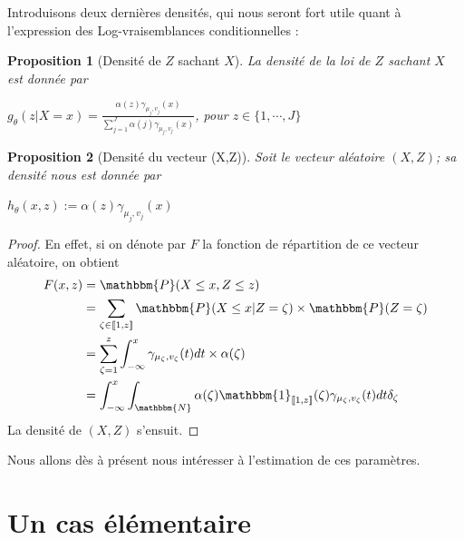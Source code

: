 \documentclass[frenchb]{report}
\newcommand{\N}{\mathbbm{N}}
\newcommand{\1}{\mathbbm{1}}
\newcommand{\prob}{\mathbbm{P}}
\newtheorem{prop}{Proposition}
\theoremstyle{definition}\newtheorem{defn}{Définition}
\theoremstyle{definition}\newtheorem{exm}{Exemple}
\theoremstyle{definition}\newtheorem{nota}{Notation}
\theoremstyle{definition}\newtheorem{rem}{Remarque}
\begin{document}
Introduisons deux dernières densités, qui nous seront fort utile quant à l'expression des Log-vraisemblances conditionnelles :

\begin{prop}[Densité de $Z$ sachant $X$] La densité de la loi de $Z$ sachant $X$ est donnée par
\begin{center}
$g_\theta(z | X=x ) = \frac{\displaystyle\alpha(z)\gamma_{\mu_j, v_j}(x)}{\displaystyle\sum_{j=1}^J\alpha(j)\gamma_{\mu_j, v_j}(x)}$, pour $z\in \{1,\cdots,J\}$
\end{center}
\end{prop}


\begin{prop}[Densité du vecteur (X,Z)]
Soit le vecteur aléatoire $(X, Z)$; sa densité nous est donnée par
\begin{center} $h_\theta(x,z) := \alpha(z)\gamma_{\mu_j, v_j}(x)$ \end{center}
\end{prop}

\begin{proof}
En effet, si on dénote par $F$ la fonction de répartition de ce vecteur aléatoire, on obtient
\begin{align*}
F(x, z) &= \prob(X \leq x, Z \leq z)\\
&=\displaystyle\sum_{\zeta \in \llbracket1,z \rrbracket} \prob(X\leq x | Z = \zeta)\times\prob(Z = \zeta)\\
&=\displaystyle\sum_{\zeta = 1}^z \int_{-\infty}^x \gamma_{\mu_\zeta,v_\zeta}(t)dt \times \alpha(\zeta)\\
&= \int_{-\infty}^x \int_\N\alpha(\zeta)\1_{\llbracket 1,z\rrbracket}(\zeta)\gamma_{\mu_\zeta,v_\zeta}(t)dt\delta_\zeta
\end{align*}
La densité de $(X,Z)$ s'ensuit.
\end{proof}

Nous allons dès à présent nous intéresser à l'estimation de ces paramètres.

\section{Un cas élémentaire}
\end{document}
